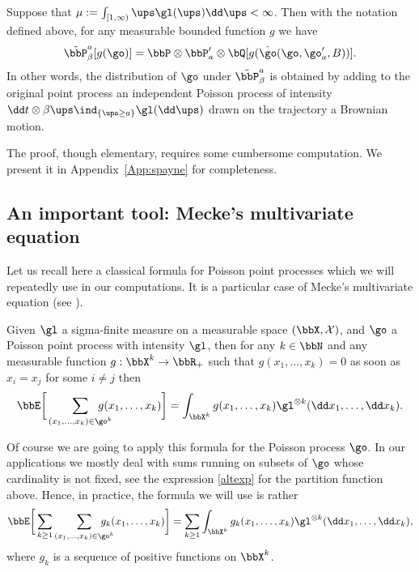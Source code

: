 \begin{lemma}\label{spayne}
Suppose that $\mu:=\int_{[1,\infty)} \ups \gl(\ups)\dd \ups<\infty$.
Then with the notation defined above, for any measurable bounded function $g$ we have
\begin{equation}\label{sides}
\tilde \bbP^a_{\beta}[ g(\go)]= \bbP\otimes \bbP'_a\otimes \bQ[ g(\hat \go(\go,\go'_a,B))].
\end{equation}
In other words, the distribution of $\go$ under $\tilde \bbP^a_{\beta}$ is obtained by adding to the original point process an independent Poisson process of intensity
$\dd t \otimes \beta\ups \ind_{\{\ups \geq a\}} \gl(\dd \ups)$ drawn on the trajectory a Brownian motion.
\end{lemma}
The proof, though elementary, requires some cumbersome computation. We present it in Appendix~\ref{App:spayne} for completeness.

\subsection{An important tool: Mecke's multivariate equation}

Let us recall here a classical formula for Poisson point processes which we will repeatedly use in our computations.
It is a particular case of Mecke's multivariate equation
(see \eg \cite[Th.\,4.4]{PoiBook}).

\begin{proposition}\label{OKLMecke}
Given $\gl$ a sigma-finite measure on a measurable space $(\bbX,\mathcal{X})$, and $\go$
a Poisson point process with intensity $\gl$, then
for any $k\in \bbN$ and any measurable function $g: \bbX^k \to \bbR_+$ such that $g (x_1,\dots, x_k)=0 $ as soon as $x_i=x_j$ for some $i\ne j$ then
\begin{equation}
\bbE \bigg[ \sum_{(x_1,\dots, x_k)\in \go^k}\hspace*{-5mm} g(x_1,\dots, x_k) \bigg]= \int_{\bbX^k} g(x_1,\dots,x_k) \gl^{\otimes k}(\dd x_1,\dots,\dd x_k).
\end{equation}

\end{proposition}
Of course we are going to apply this formula for the Poisson process $\go$. In our applications we mostly deal with sums running on subsets of $\go$ whose cardinality is not fixed, see the expression \eqref{altexp} for the partition function above. Hence, in practice, the formula we will use is rather
\begin{equation}\label{nonfixedcard}
\bbE \bigg[ \sum_{k\ge 1} \sum_{(x_1,\dots, x_k)\in \go^k}\hspace*{-5mm} g_k(x_1,\dots, x_k) \bigg]= \sum_{k\ge 1} \int_{\bbX^k} g_k(x_1,\dots,x_k) \gl^{\otimes k}(\dd x_1,\dots,\dd x_k),
\end{equation}
where $g_k$ is a sequence of positive functions on $\bbX^k$.

